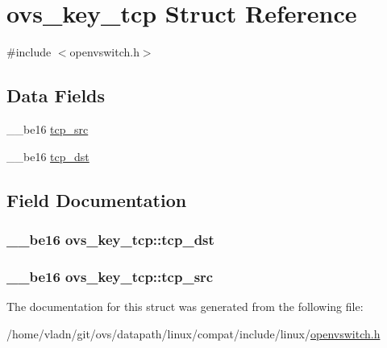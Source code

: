 \hypertarget{structovs__key__tcp}{}\section{ovs\+\_\+key\+\_\+tcp Struct Reference}
\label{structovs__key__tcp}


{\ttfamily \#include $<$openvswitch.\+h$>$}

\subsection*{Data Fields}
\begin{DoxyCompactItemize}
\item 
\+\_\+\+\_\+be16 \hyperlink{structovs__key__tcp_a6ce4cb2971be0b952a5a7cde1eefc28e}{tcp\+\_\+src}
\item 
\+\_\+\+\_\+be16 \hyperlink{structovs__key__tcp_a37a5793e8ba3701ac70693073a24668a}{tcp\+\_\+dst}
\end{DoxyCompactItemize}


\subsection{Field Documentation}
\hypertarget{structovs__key__tcp_a37a5793e8ba3701ac70693073a24668a}{}
\subsubsection[{tcp\+\_\+dst}]{\setlength{\rightskip}{0pt plus 5cm}\+\_\+\+\_\+be16 ovs\+\_\+key\+\_\+tcp\+::tcp\+\_\+dst}\label{structovs__key__tcp_a37a5793e8ba3701ac70693073a24668a}
\hypertarget{structovs__key__tcp_a6ce4cb2971be0b952a5a7cde1eefc28e}{}
\subsubsection[{tcp\+\_\+src}]{\setlength{\rightskip}{0pt plus 5cm}\+\_\+\+\_\+be16 ovs\+\_\+key\+\_\+tcp\+::tcp\+\_\+src}\label{structovs__key__tcp_a6ce4cb2971be0b952a5a7cde1eefc28e}


The documentation for this struct was generated from the following file\+:\begin{DoxyCompactItemize}
\item 
/home/vladn/git/ovs/datapath/linux/compat/include/linux/\hyperlink{openvswitch_8h}{openvswitch.\+h}\end{DoxyCompactItemize}
